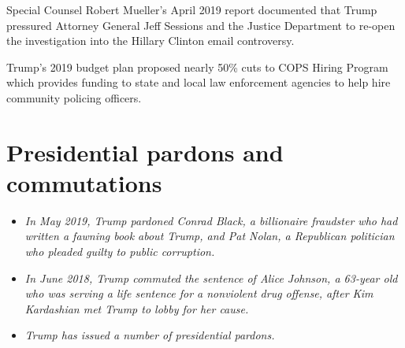 Special Counsel Robert Mueller's April 2019 report documented that Trump
pressured Attorney General Jeff Sessions and the Justice Department to
re-open the investigation into the Hillary Clinton email controversy.

Trump's 2019 budget plan proposed nearly 50\% cuts to COPS Hiring
Program which provides funding to state and local law enforcement
agencies to help hire community policing officers.

\section{Presidential pardons and
commutations}\label{presidential-pardons-and-commutations}

\begin{itemize}
\item
  \emph{In May 2019, Trump pardoned Conrad Black, a billionaire
  fraudster who had written a fawning book about Trump, and Pat Nolan, a
  Republican politician who pleaded guilty to public corruption.}
\item
  \emph{In June 2018, Trump commuted the sentence of Alice Johnson, a
  63-year old who was serving a life sentence for a nonviolent drug
  offense, after Kim Kardashian met Trump to lobby for her cause.}
\item
  \emph{Trump has issued a number of presidential pardons.}
\end{itemize}

